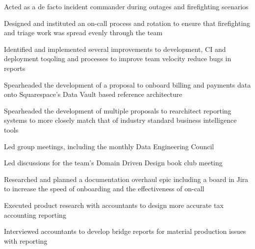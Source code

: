 \begin{job}

  \begin{accomplishments}
    \item Acted as a de facto incident commander during outages and firefighting
    scenarios
    \item Designed and instituted an on-call process and rotation to ensure that
    firefighting and triage work was spread evenly through the team
    \item Identified and implemented several improvements to development, CI and
    deployment toqoling and processes to improve team velocity reduce bugs in
    reports
    \item Spearheaded the development of a proposal to onboard billing and
    payments data onto Squarespace's Data Vault based reference architecture
    \item Spearheaded the development of multiple proposals to rearchitect
    reporting systems to more closely match that of industry standard business
    intelligence tools
    \item Led group meetings, including the monthly Data Engineering Council
    \item Led discussions for the team's Domain Driven Design book club
    meeting
    \item Researched and planned a documentation overhaul epic including a board
    in Jira to increase the speed of onboarding and the effectiveness of on-call
    \item Executed product research with accountants to design more accurate tax
    accounting reporting
    \item Interviewed accountants to develop bridge reports for material
    production issues with reporting
  \end{accomplishments}
\end{job}

